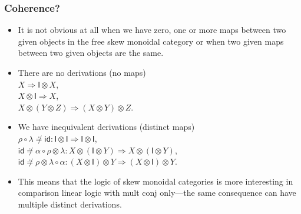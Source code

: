 \documentclass[10pt,t]{beamer}
\newcommand{\I}{\mathsf{I}}
\newcommand{\ot}{\otimes}
\newcommand{\al}{\alpha}
\newcommand{\lam}{\lambda}
\newcommand{\tto}{\Longrightarrow}
\newcommand{\id}{\mathsf{id}}
\newcommand{\comp}{\circ}
\begin{document}
\begin{frame}

\frametitle{Coherence?}

\begin{itemize}

\item It is not obvious at all when we have zero, one or more maps
  between two given objects in the free skew monoidal category or when
  two given maps between two given objects are the same.

\bigskip

\item There are no derivations (no maps) \\[6pt]

 $X \tto \I \ot X$, \\ 

 $X \ot \I \tto X$, \\

 $X \ot (Y \ot Z) \tto (X \ot Y) \ot Z$.

\medskip

\item We have inequivalent derivations (distinct maps) \\[6pt]

 $\rho \comp \lam \not\doteq \id : \I \ot \I \tto \I \ot \I$, \\

 $\id \not\doteq \al \comp  \rho \ot \lam : 
 X \ot (\I \ot Y) \tto X \ot (\I \ot Y) $, \\

 $\id \not\doteq \rho \ot \lam \comp \al :
 (X \ot \I) \ot Y \tto (X \ot \I) \ot Y$.

\bigskip


\item This means that the logic of skew monoidal categories is more
  interesting in comparison linear logic with mult conj only---the
  same consequence can have multiple distinct derivations.

\end{itemize}

\end{frame}
\end{document}
